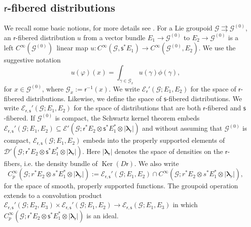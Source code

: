 \documentclass[a4paper,reqno]{amsart}
\numberwithin{equation}{section}
\def\ker{\operatorname{Ker}}
\theoremstyle{definition}
\theoremstyle{remark}
\begin{document}
\subsection{$\mathsf{r}$-fibered distributions}
We recall some basic notions, for more details see \cite{vanerpyunck}. For a Lie groupoid $\mathcal{G}\rightrightarrows \mathcal{G}^{(0)}$, an $\mathsf{r}$-fibered distribution $u$ from a vector bundle $E_1\to \mathcal{G}^{(0)}$ to $E_2\to \mathcal{G}^{(0)}$  is a left $C^\infty( \mathcal{G}^{(0)})$ linear map $u:C^\infty(\mathcal{G},\mathsf{s}^*E_1)\to C^\infty(\mathcal{G}^{(0)},E_2)$. We use the suggestive notation 
$$u(\varphi)(x)=\int_{\gamma\in \mathcal{G}_x}u(\gamma)\phi(\gamma),$$ 
for $x\in \mathcal{G}^{(0)}$, where $\mathcal{G}_x:=\mathsf{r}^{-1}(x)$. We write $\mathcal{E}_\mathsf{r}'(\mathcal{G};E_1,E_2)$ for the space of $\mathsf{r}$-fibered distributions. Likewise, we define the space of $\mathsf{s}$-fibered distributions. We write $\mathcal{E}_{\mathsf{r},\mathsf{s}}'(\mathcal{G};E_1,E_2)$ for the space of distributions that are both $\mathsf{r}$-fibered and $\mathsf{s}$-fibered. If $\mathcal{G}^{(0)}$ is compact, the Schwartz kernel theorem embeds $\mathcal{E}_{\mathsf{r},\mathsf{s}}'(\mathcal{G};E_1,E_2)\subseteq \mathcal{E}'(\mathcal{G};\mathsf{r}^*E_2\otimes \mathsf{s}^*E_1^*\otimes |\pmb{\lambda}_\mathsf{r}|)$ and without assuming that $\mathcal{G}^{(0)}$ is compact, $\mathcal{E}_{\mathsf{r},\mathsf{s}}(\mathcal{G};E_1,E_2)$ embeds into the properly supported elements of $\mathcal{D}'(\mathcal{G};\mathsf{r}^*E_2\otimes \mathsf{s}^*E_1^*\otimes |\pmb{\lambda}_\mathsf{r}|)$. Here $|\pmb{\lambda}_\mathsf{r}|$ denotes the space of densities on the $\mathsf{r}$-fibers, i.e. the density bundle of $\ker(D\mathsf{r})$. We also write 
$$C^\infty_p(\mathcal{G};r^*E_2\otimes s^*E_1^*\otimes |\pmb{\lambda}_r|):=\mathcal{E}_{\mathsf{r},\mathsf{s}}'(\mathcal{G};E_1,E_2)\cap C^\infty(\mathcal{G};r^*E_2\otimes s^*E_1^*\otimes |\pmb{\lambda}_r|),$$
for the space of smooth, properly supported functions. The groupoid operation extends to a convolution product $\mathcal{E}_{\mathsf{r},\mathsf{s}}'(\mathcal{G};E_2,E_3)\times \mathcal{E}_{\mathsf{r},\mathsf{s}}'(\mathcal{G};E_1,E_2)\to \mathcal{E}_{\mathsf{r},\mathsf{s}}(\mathcal{G};E_1,E_3)$ in which $C^\infty_p(\mathcal{G};\mathsf{r}^*E_2\otimes \mathsf{s}^*E_1^*\otimes |\pmb{\lambda}_\mathsf{r}|)$ is an ideal. 
\end{document}
